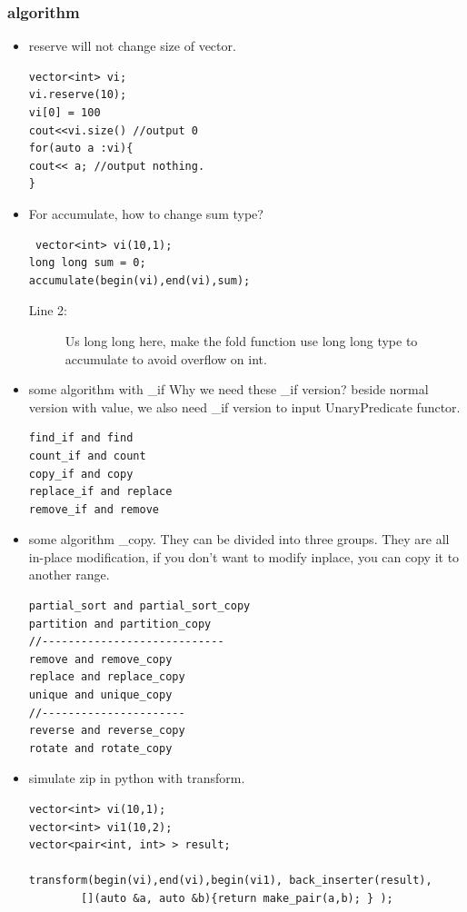 \documentclass[a4paper,11pt,twoside]{book}
\begin{document}
\subsubsection{algorithm}
\begin{itemize}
\item reserve will not change size of vector. 
\begin{lstlisting}
vector<int> vi;
vi.reserve(10);
vi[0] = 100
cout<<vi.size() //output 0
for(auto a :vi){
cout<< a; //output nothing.
}
\end{lstlisting}

\item For accumulate, how to change sum type?
\begin{lstlisting}
 vector<int> vi(10,1);
long long sum = 0;
accumulate(begin(vi),end(vi),sum);
\end{lstlisting}
\begin{description}
\item[Line 2:] Us long long here, make the fold function use long long type to accumulate to avoid overflow on int.
\end{description}

\item some algorithm with \_if  Why we need these \_if version? beside normal version with value, we also need \_if version to input UnaryPredicate functor. 
\begin{lstlisting}
find_if and find
count_if and count
copy_if and copy
replace_if and replace
remove_if and remove
\end{lstlisting}

\item some algorithm \_copy. They can be divided into three groups. They are all in-place modification, if you don't want to modify inplace, you can copy it to another range.
\begin{lstlisting}
partial_sort and partial_sort_copy
partition and partition_copy
//----------------------------
remove and remove_copy
replace and replace_copy
unique and unique_copy
//----------------------
reverse and reverse_copy
rotate and rotate_copy
\end{lstlisting}

\item simulate zip in python with transform.
\begin{lstlisting}
vector<int> vi(10,1);
vector<int> vi1(10,2);
vector<pair<int, int> > result;

transform(begin(vi),end(vi),begin(vi1), back_inserter(result),
        [](auto &a, auto &b){return make_pair(a,b); } );
      

\end{lstlisting}
\end{itemize}
\end{document}
